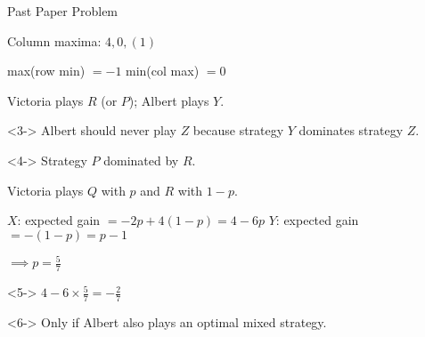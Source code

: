 \documentclass[8pt]{beamer}
\begin{document}
\begin{frame}[shrink=20]{Past Paper Problem}
\begin{solution}
	Column maxima: $4,0,(1)$
	
	max(row min) $=-1$
	min(col max) $=0$
	
	Victoria plays $R$ (or $P$); Albert plays $Y$.
\end{solution}
\begin{solution}<3->
	Albert should never play $Z$ because strategy $Y$ dominates strategy $Z$.
	\end{solution}
\begin{solution}<4->
	Strategy $P$ dominated by $R$.
	
	Victoria plays $Q$ with $p$ and $R$ with $1-p$.
	
	$X$: expected gain $=-2p+4(1-p)=4-6p$
	$Y$: expected gain $=-(1-p)=p-1$
	
	$\implies p=\frac{5}{7}$
\end{solution}
\begin{solution}<5->
	$4-6\times \frac{5}{7}=-\frac{2}{7}$
\end{solution}
\begin{solution}<6->
	Only if Albert also plays an optimal mixed strategy.
\end{solution}
\end{frame}
\end{document}
